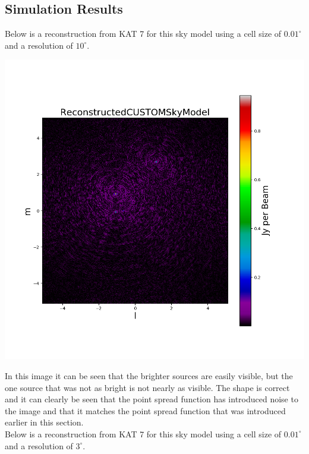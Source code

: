 \subsection{Simulation Results}
Below is a reconstruction from KAT 7 for this sky model using a cell size of $0.01^\circ$ and a resolution of $10^\circ$. 
\begin{center}
    \includegraphics[scale=0.4]{images/RECON_KAT_7_4_POINT.png}
\end{center}
In this image it can be seen that the brighter sources are easily visible, but the one source that was not as bright is not nearly as visible.  The shape is correct and it can clearly be seen that the point spread function has introduced noise to the image and that it matches the point spread function that was introduced earlier in this section.\\
Below is a reconstruction from KAT 7 for this sky model using a cell size of $0.01^\circ$ and a resolution of $3^\circ$. 
